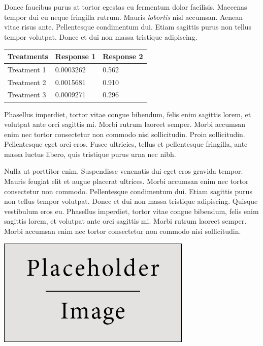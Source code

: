 \documentclass[a0,landscape]{a0poster}
\begin{document}
\begin{multicols}{4}
    Donec faucibus purus at tortor egestas eu fermentum dolor facilisis. Maecenas tempor dui eu neque fringilla rutrum. Mauris \emph{lobortis} nisl accumsan. Aenean vitae risus ante. Pellentesque condimentum dui. Etiam sagittis purus non tellus tempor volutpat. Donec et dui non massa tristique adipiscing.
    \begin{table} %
        \begin{tabular}{l l l}
            \toprule
            \textbf{Treatments} & \textbf{Response 1} & \textbf{Response 2} \\
            \midrule
            Treatment 1         & 0.0003262           & 0.562               \\
            Treatment 2         & 0.0015681           & 0.910               \\
            Treatment 3         & 0.0009271           & 0.296               \\
            \bottomrule
        \end{tabular}
    \end{table}
    Phasellus imperdiet, tortor vitae congue bibendum, felis enim sagittis lorem, et volutpat ante orci sagittis mi. Morbi rutrum laoreet semper. Morbi accumsan enim nec tortor consectetur non commodo nisi sollicitudin. Proin sollicitudin. Pellentesque eget orci eros. Fusce ultricies, tellus et pellentesque fringilla, ante massa luctus libero, quis tristique purus urna nec nibh.

    Nulla ut porttitor enim. Suspendisse venenatis dui eget eros gravida tempor. Mauris feugiat elit et augue placerat ultrices. Morbi accumsan enim nec tortor consectetur non commodo. Pellentesque condimentum dui. Etiam sagittis purus non tellus tempor volutpat. Donec et dui non massa tristique adipiscing. Quisque vestibulum eros eu. Phasellus imperdiet, tortor vitae congue bibendum, felis enim sagittis lorem, et volutpat ante orci sagittis mi. Morbi rutrum laoreet semper. Morbi accumsan enim nec tortor consectetur non commodo nisi sollicitudin.

    \begin{center}\vspace{1cm}
        \includegraphics[width=0.8\linewidth]{placeholder}
    \end{center}\vspace{1cm}


\end{multicols}
\end{document}
